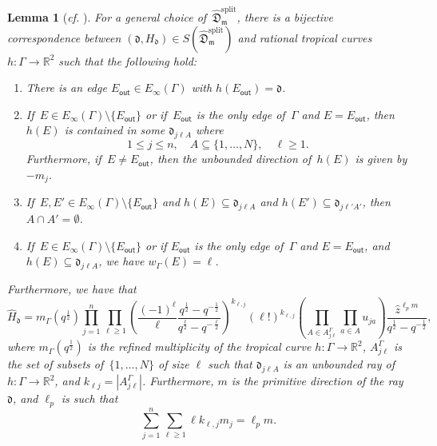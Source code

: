 \documentclass[11pt]{amsart}
\numberwithin{equation}{section}
\theoremstyle{plain}
\newtheorem{lemma}[theorem]{Lemma}
\theoremstyle{remark}
\theoremstyle{definition}
\newcommand\fd{\mathfrak d}
\newcommand\fD{\mathfrak D}
\newcommand\fm{\mathfrak m}
\newcommand{\RR}{\mathbb{R}}
\begin{document}
\begin{lemma}[\textit{cf.} {\cite[Proof of Proposition 6.2]{bousseau2020quantumtrop}}]\label{Lemma : ray bijection}
For a general choice of\, $\hat{\fD}_{\fm}^{\mathrm{split}}$, there is a bijective cor\-re\-spon\-dence between $(\fd,H_{\fd}) \in S(\hat{\fD}_{\fm}^{\mathrm{split}})$ and rational tropical curves $h \colon \Gamma \rightarrow \RR^2$ such that the following hold:  
\begin{enumerate}[label={\rm(\roman*)}, ref={\rm\roman*}]
\item There is an edge $E_{\mathsf{out}}\in E_{\infty}(\Gamma)$ with
$h(E_{\mathsf{out}})=\fd$.
\item If\, $E\in E_{\infty}(\Gamma)\setminus
\{E_{\mathsf{out}}\}$ or if\, $E_{\mathsf{out}}$ is the only edge of\, $\Gamma$
and $E=E_{\mathsf{out}}$, 
then $h(E)$ is contained in some $\fd_{j \ell A}$ where 
$$1\le j\le n,\quad A\subseteq\{1,\ldots,N\}, \quad \ell\ge 1.$$
Furthermore,
if\, $E\not=E_{\mathsf{out}}$, then  
the unbounded direction of\, $h(E)$ is given by $-m_j$.
\item
 If\, $E,E'\in E_{\infty}(\Gamma)\setminus\{E_{\mathsf{out}}\}$
and $h(E)\subseteq \fd_{j\ell A}$ and $h(E')\subseteq
\fd_{j \ell' A'}$, then $A\cap A'=\emptyset$.
\item If\, $E\in E_{\infty}(\Gamma)\setminus\{E_{\mathsf{out}}\}$
or if $E_{\mathsf{out}}$ is the only edge of\, $\Gamma$ and $E=E_{\mathsf{out}}$,
and $h(E)\subseteq \fd_{j \ell A}$, we have $w_{\Gamma}(E)=\ell$.
\end{enumerate}
Furthermore,  we have that
\begin{equation}\label{eq : hamiltonian expression}
\hat{H}_{\fd} = m_{\Gamma}(q^{\frac{1}{2}})\prod_{j=1}^n \prod_{\ell \geq 1}\left(\frac{(-1)^{\ell}}{\ell} \frac{q^{\frac{1}{2}} - q^{-\frac{1}{2}}}{q^{\frac{\ell}{2}} - q^{-\frac{\ell}{2}}}\right)^{k_{\ell,j}} (\ell !)^{k_{\ell,j}} \left(\prod_{A \in A^{\Gamma}_{j \ell}} \prod_{a \in A} u_{ja}\right)\frac{\hat{z}^{\ell_p m}}{q^{\frac{1}{2}} - q^{-\frac{1}{2}}}, 
\end{equation}
where $m_{\Gamma}(q^{\frac{1}{2}})$ is the refined multiplicity of the tropical curve $h\colon \Gamma \rightarrow \RR^2$, $A_{j \ell}^{\Gamma}$ is the set of subsets of\, $\{1,\dots, N\}$ of size $\ell$ such that $\fd_{j \ell A}$ is an unbounded ray of $h \colon\Gamma \rightarrow \RR^2$, and $k_{\ell j} = |A_{j \ell}^\Gamma|$. Furthermore, $m$ is the primitive direction of the ray $\fd$, and $\ell_p$ is such that $$\sum_{j=1}^n \sum_{\ell \geq 1} \ell k_{\ell,j} m_j = \ell_p m.$$
\end{lemma}
\end{document}
